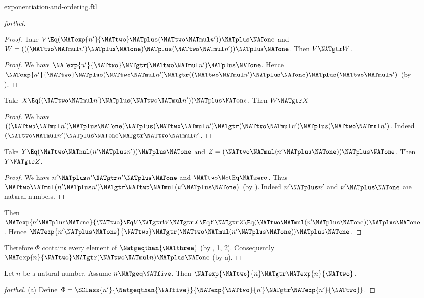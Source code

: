 \documentclass{stex}
\begin{document}
\begin{smodule}{exponentiation-and-ordering.ftl}
\begin{proof}[forthel]
\begin{proof}
    Take $V \Eq (\NATexp{n'}{\NATtwo} \NATplus (\NATtwo \NATmul n')) \NATplus \NATone$ and $W = (((\NATtwo \NATmul n') \NATplus \NATone) \NATplus (\NATtwo \NATmul n')) \NATplus \NATone$.
    Then $V \NATgtr W$.
    \begin{proof}
      We have $\NATexp{n'}{\NATtwo} \NATgtr (\NATtwo \NATmul n') \NATplus \NATone$.
      Hence $\NATexp{n'}{\NATtwo} \NATplus (\NATtwo \NATmul n') \NATgtr ((\NATtwo \NATmul n') \NATplus \NATone) \NATplus (\NATtwo \NATmul n')$ (by ).
    \end{proof}

    Take $X \Eq ((\NATtwo \NATmul n') \NATplus (\NATtwo \NATmul n')) \NATplus \NATone$.
    Then $W \NATgtr X$.
    \begin{proof}
      We have $((\NATtwo \NATmul n') \NATplus \NATone) \NATplus (\NATtwo \NATmul n') \NATgtr (\NATtwo \NATmul n') \NATplus (\NATtwo \NATmul n')$.
      Indeed $(\NATtwo \NATmul n') \NATplus \NATone \NATgtr \NATtwo \NATmul n'$.
    \end{proof}

    Take $Y \Eq (\NATtwo \NATmul (n' \NATplus n')) \NATplus \NATone$ and $Z = (\NATtwo \NATmul (n' \NATplus \NATone)) \NATplus \NATone$.
    Then $Y \NATgtr Z$.
    \begin{proof}
      We have $n' \NATplus n' \NATgtr n' \NATplus \NATone$ and $\NATtwo \NotEq \NATzero$.
      Thus $\NATtwo \NATmul (n' \NATplus n') \NATgtr \NATtwo \NATmul (n' \NATplus \NATone)$ (by ).
      Indeed $n' \NATplus n'$ and $n' \NATplus \NATone$ are natural numbers.
    \end{proof}

    Then $\NATexp{n' \NATplus \NATone}{\NATtwo} \Eq V \NATgtr W \NATgtr X \Eq Y \NATgtr Z \Eq (\NATtwo \NATmul (n' \NATplus \NATone)) \NATplus \NATone$.
    Hence $\NATexp{n' \NATplus \NATone}{\NATtwo} \NATgtr (\NATtwo \NATmul (n' \NATplus \NATone)) \NATplus \NATone$.
  \end{proof}

  Therefore $\Phi$ contains every element of $\Natgeqthan{\NATthree}$ (by , 1, 2).
  Consequently $\NATexp{n}{\NATtwo} \NATgtr (\NATtwo \NATmul n) \NATplus \NATone$ (by a).
\end{proof}

\begin{proposition}[forthel]
  Let $n$ be a natural number.
  Assume $n \NATgeq \NATfive$.
  Then $\NATexp{\NATtwo}{n} \NATgtr \NATexp{n}{\NATtwo}$.
\end{proposition}
\begin{proof}[forthel]
  (a) Define $\Phi = \SClass{n'}{\Natgeqthan{\NATfive}}{\NATexp{\NATtwo}{n'} \NATgtr \NATexp{n'}{\NATtwo}}$.


\end{proof}
\end{smodule}
\end{document}
